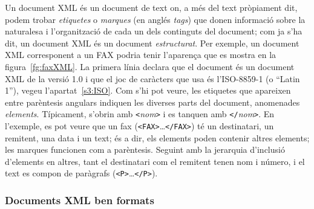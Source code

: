 Un document XML és un document de text on, a més del text pròpiament
dit, podem trobar \emph{etiquetes} o \emph{marques} (en anglés
\emph{tags}) que donen informació sobre la naturalesa i l'organització
de cada un dels continguts del document; com ja s'ha dit, un document
XML és un document \emph{estructurat}. Per exemple, un document XML
corresponent a un FAX podria tenir l'aparença que es mostra en la
figura~\ref{fg:faxXML}.  La primera línia declara que el document és
un document XML de la versió 1.0 i que el joc de caràcters que usa és
l'ISO-8859-1 (o ``Latin 1''), vegeu l'apartat~\ref{s3:ISO}. Com s'hi pot veure, les etiquetes que
apareixen entre parèntesis angulars indiquen les diverses parts del
document, anomenades \emph{elements}.  Típicament, s'obrin amb
\texttt{<}\emph{nom}\texttt{>} i es tanquen amb
\texttt{</}\emph{nom}\texttt{>}.  En l'exemple, es pot veure que un
fax (\texttt{<FAX>}\ldots\texttt{</FAX>}) té un destinatari, un
remitent, una data i un text; és a dir, els elements poden contenir
altres elements; les marques funcionen com a parèntesis. Seguint amb
la jerarquia d'inclusió d'elements en altres, tant el destinatari com
el remitent tenen nom i número, i el text es compon de paràgrafs
(\texttt{<P>}\ldots\texttt{</P>}).


\subsubsection{Documents XML ben formats}

